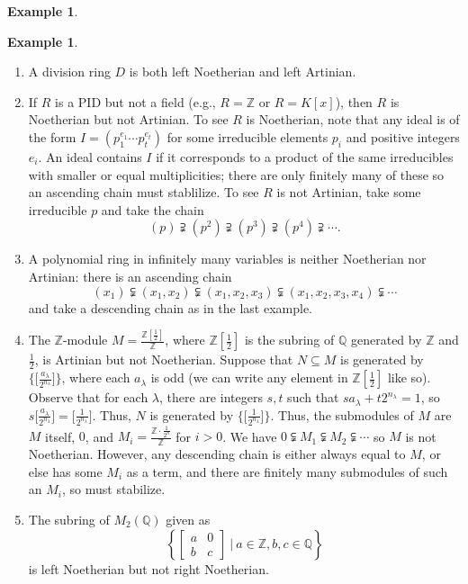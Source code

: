\documentclass{amsart}[12pt]
\newcommand{\Q}{\mathbb{Q}}
\newcommand{\Z}{\mathbb{Z}}
\numberwithin{equation}{section}
\theoremstyle{plain} %
\theoremstyle{definition}
\newtheorem{ex}[equation]{Example}
\theoremstyle{remark}
\begin{document}
\begin{ex}
\begin{ex} 
\begin{enumerate}
\item A division ring $D$ is both left Noetherian and left Artinian.
\item If $R$ is a PID but not a field (e.g., $R=\Z$ or $R=K[x]$), then $R$ is Noetherian but not Artinian. To see $R$ is Noetherian, note that any ideal is of the form $I=(p_1^{e_1} \cdots p_t^{e_t})$ for some irreducible elements $p_i$ and positive integers $e_i$. An ideal contains $I$ if it corresponds to a product of the same irreducibles with smaller or equal multiplicities; there are only finitely many of these so an ascending chain must stablilize. To see $R$ is not Artinian, take some irreducible $p$ and take the chain
\[ (p) \supsetneqq (p^2) \supsetneqq (p^3) \supsetneqq (p^4) \supsetneqq \cdots .\]
\item A polynomial ring in infinitely many variables is neither Noetherian nor Artinian: there is an ascending chain
\[ (x_1) \subsetneqq (x_1,x_2)  \subsetneqq (x_1,x_2,x_3)  \subsetneqq (x_1,x_2,x_3,x_4) \subsetneqq \cdots\]
and take a descending chain as in the last example.
\item The $\Z$-module $M=\displaystyle \frac{\Z[\frac12]}{\Z}$, where $\Z[\frac12]$ is the subring of $\Q$ generated by $\Z$ and $\frac12$, is Artinian but not Noetherian. Suppose that $N\subseteq M$ is generated by $\displaystyle \big\{ \big[\frac{a_\lambda}{2^{n_\lambda}}\big]\big\}$, where each $a_\lambda$ is odd (we can write any element in $\Z[\frac12]$ like so). Observe that for each $\lambda$, there are integers $s,t$ such that $\displaystyle s a_\lambda + t 2^{n_\lambda} = 1$, so $\displaystyle s \big[\frac{a_\lambda}{2^{n_\lambda}}\big] = \big[\frac{1}{2^{n_\lambda}}\big]$. Thus, $N$ is generated by $\displaystyle \big\{ \big[\frac{1}{2^{n_\lambda}}\big]\big\}$. Thus, the submodules of $M$ are $M$ itself, $0$, and $M_i = \displaystyle \frac{\Z \cdot \frac{1}{2^n}}{\Z}$ for $i>0$. We have $0 \subsetneqq M_1 \subsetneqq M_2 \subsetneqq \cdots$ so $M$ is not Noetherian. However, any descending chain is either always equal to $M$, or else has some $M_i$ as a term, and there are finitely many submodules of such an $M_i$, so must stabilize.
\item The subring of $M_2(\Q)$ given as \[ \left\{ \begin{bmatrix} a & 0 \\ b & c \end{bmatrix} \ \big| \ a\in \Z, b,c\in \Q \right\} \]
is left Noetherian but not right Noetherian.
\end{enumerate}
\end{ex}


\end{ex}
\end{document}
